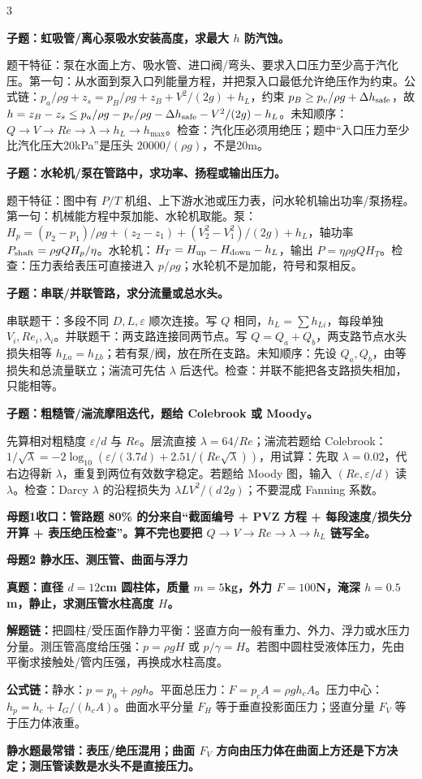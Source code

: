 \documentclass[a4paper]{article}
\newcommand{\mt}[1]{\vspace{0.45pt}\colorbox{M}{\parbox{\dimexpr\linewidth-2\fboxsep}{\color{white}\bfseries #1}}\par}
\newcommand{\qt}[1]{\vspace{0.25pt}\colorbox{Q}{\parbox{\dimexpr\linewidth-2\fboxsep}{\color{white}\bfseries #1}}\par}
\newcommand{\ans}[1]{\colorbox{G}{\parbox{\dimexpr\linewidth-2\fboxsep}{#1}}\par}
\newcommand{\warn}[1]{\colorbox{Y}{\parbox{\dimexpr\linewidth-2\fboxsep}{\color{E}\bfseries #1}}\par}
\newcommand{\chain}[1]{{\color{A}\bfseries 解题链：}#1\par}
\newcommand{\form}[1]{{\color{M}\bfseries 公式链：}#1\par}
\begin{document}
\begin{multicols}{3}
\qt{子题：虹吸管/离心泵吸水安装高度，求最大 $h$ 防汽蚀。}
\ans{题干特征：泵在水面上方、吸水管、进口阀/弯头、要求入口压力至少高于汽化压。第一句：从水面到泵入口列能量方程，并把泵入口最低允许绝压作为约束。公式链：$p_a/\rho g+z_s=p_B/\rho g+z_B+V^2/(2g)+h_L$，约束 $p_B\ge p_v/\rho g+\Delta h_{\rm safe}$，故 $h=z_B-z_s\le p_a/\rho g-p_v/\rho g-\Delta h_{\rm safe}-V^2/(2g)-h_L$。未知顺序：$Q\to V\to Re\to\lambda\to h_L\to h_{\max}$。检查：汽化压必须用绝压；题中“入口压力至少比汽化压大20kPa”是压头 $20000/(\rho g)$，不是20m。}
\qt{子题：水轮机/泵在管路中，求功率、扬程或输出压力。}
\ans{题干特征：图中有 $P/T$ 机组、上下游水池或压力表，问水轮机输出功率/泵扬程。第一句：机械能方程中泵加能、水轮机取能。泵：$H_p=(p_2-p_1)/\rho g+(z_2-z_1)+(V_2^2-V_1^2)/(2g)+h_L$，轴功率 $P_{\rm shaft}=\rho gQH_p/\eta$。水轮机：$H_T=H_{\rm up}-H_{\rm down}-h_L$，输出 $P=\eta\rho gQH_T$。检查：压力表给表压可直接进入 $p/\rho g$；水轮机不是加能，符号和泵相反。}
\qt{子题：串联/并联管路，求分流量或总水头。}
\ans{串联题干：多段不同 $D,L,\varepsilon$ 顺次连接。写 $Q$ 相同，$h_L=\sum h_{Li}$，每段单独 $V_i,Re_i,\lambda_i$。并联题干：两支路连接同两节点。写 $Q=Q_a+Q_b$，两支路节点水头损失相等 $h_{La}=h_{Lb}$；若有泵/阀，放在所在支路。未知顺序：先设 $Q_a,Q_b$，由等损失和总流量联立；湍流可先估 $\lambda$ 后迭代。检查：并联不能把各支路损失相加，只能相等。}
\qt{子题：粗糙管/湍流摩阻迭代，题给 Colebrook 或 Moody。}
\ans{先算相对粗糙度 $\varepsilon/d$ 与 $Re$。层流直接 $\lambda=64/Re$；湍流若题给 Colebrook：$1/\sqrt{\lambda}=-2\log_{10}(\varepsilon/(3.7d)+2.51/(Re\sqrt{\lambda}))$，用试算：先取 $\lambda=0.02$，代右边得新 $\lambda$，重复到两位有效数字稳定。若题给 Moody 图，输入 $(Re,\varepsilon/d)$ 读 $\lambda$。检查：Darcy $\lambda$ 的沿程损失为 $\lambda L V^2/(d\,2g)$；不要混成 Fanning 系数。}
\warn{母题1收口：管路题 80\% 的分来自“截面编号 + PVZ 方程 + 每段速度/损失分开算 + 表压绝压检查”。算不完也要把 $Q\to V\to Re\to\lambda\to h_L$ 链写全。}

\mt{母题2 静水压、测压管、曲面与浮力}
\qt{真题：直径 $d=12$cm 圆柱体，质量 $m=5$kg，外力 $F=100$N，淹深 $h=0.5$m，静止，求测压管水柱高度 $H$。}
\chain{把圆柱/受压面作静力平衡：竖直方向一般有重力、外力、浮力或水压力分量。测压管高度给压强：$p=\rho gH$ 或 $p/\gamma=H$。若图中圆柱受液体压力，先由平衡求接触处/管内压强，再换成水柱高度。}
\form{静水：$p=p_0+\rho gh$。平面总压力：$F=p_cA=\rho gh_cA$。压力中心：$h_p=h_c+I_G/(h_cA)$。曲面水平分量 $F_H$ 等于垂直投影面压力；竖直分量 $F_V$ 等于压力体液重。}
\warn{静水题最常错：表压/绝压混用；曲面 $F_V$ 方向由压力体在曲面上方还是下方决定；测压管读数是水头不是直接压力。}


\end{multicols}
\end{document}
